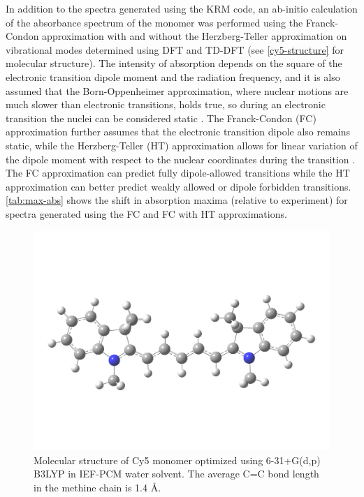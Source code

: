 In addition to the spectra generated using the KRM code, an ab-initio calculation of the absorbance spectrum of the monomer was performed using the Franck-Condon approximation with and without the Herzberg-Teller approximation on vibrational modes determined using DFT and TD-DFT (see \autoref{cy5-structure} for molecular structure). The intensity of absorption depends on the square of the electronic transition dipole moment and the radiation frequency, and it is also assumed that the Born-Oppenheimer approximation, where nuclear motions are much slower than electronic transitions, holds true, so during an electronic transition the nuclei can be considered static \cite{Born2000}. The Franck-Condon (FC) approximation further assumes that the electronic transition dipole also remains static, while the Herzberg-Teller (HT) approximation allows for linear variation of the dipole moment with respect to the nuclear coordinates during the transition \cite{Franck1926a, Condon1926, Santoro2007, Santoro2008}. The FC approximation can predict fully dipole-allowed transitions while the HT approximation can better predict weakly allowed or dipole forbidden transitions. \autoref{tab:max-abs} shows the shift in absorption maxima (relative to experiment) for spectra generated using the FC and FC with HT approximations. 
\begin{figure}[h!]
    \centering
    \includegraphics[width=0.8\linewidth]{figures/pub1/cy5-B3LYP.pdf}
    \caption{Molecular structure of Cy5 monomer optimized using 6-31+G(d,p) B3LYP in IEF-PCM water solvent. The average C=C bond length in the methine chain is 1.4 \AA. }\label{cy5-structure}
\end{figure}

